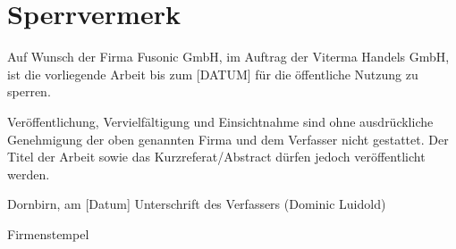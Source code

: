 \documentclass[a4paper,12pt,twoside]{scrreprt}
\begin{document}
\onehalfspacing %

\thispagestyle{empty}

\section*{Sperrvermerk}
\label{sec:sperrvermerk}
Auf Wunsch der Firma Fusonic GmbH, im Auftrag der Viterma Handels GmbH, ist die vorliegende Arbeit bis zum [DATUM] für die öffentliche Nutzung zu sperren.

Veröffentlichung, Vervielfältigung und Einsichtnahme sind ohne ausdrückliche Genehmigung der oben genannten Firma und dem Verfasser nicht gestattet. Der Titel der Arbeit sowie das Kurzreferat/Abstract dürfen jedoch veröffentlicht werden.

\vspace{3cm}

\noindent Dornbirn, am [Datum] \hfill Unterschrift des Verfassers (Dominic Luidold)

\vspace{2cm}

\hfill Firmenstempel\hspace{2cm}
\end{document}
